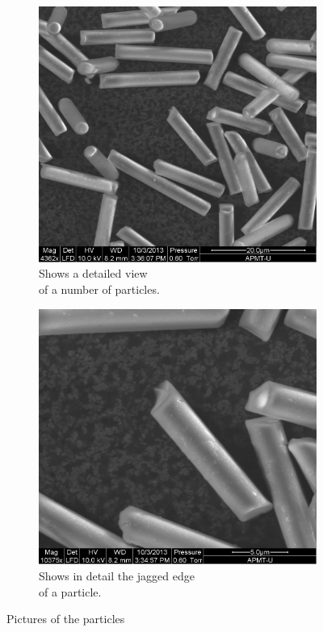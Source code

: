 \begin{figure}[H]
\centering
\begin{subfigure}[3a]{0.40\textwidth}
\includegraphics[width=\textwidth]{figures/semizoomed.png}
\caption{Shows a detailed view \\ of a number of particles.}
\end{subfigure}\hspace{1em}%
\begin{subfigure}[3b]{0.40\textwidth}
\includegraphics[width=\textwidth]{figures/zoomedbroken.png}
\caption{Shows in detail the jagged edge \\ of a particle.}
\end{subfigure}
\caption{Pictures of the particles}
\label{fig:particlepictures}
\end{figure}


